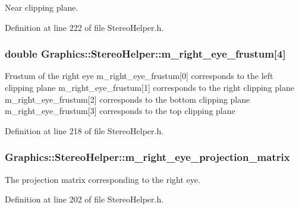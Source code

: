 Near clipping plane. 



Definition at line 222 of file StereoHelper.h.

\hypertarget{class_graphics_1_1_stereo_helper_a2542b4e8d37d72b4bb0ed2e7c3bc919f}{
\subsubsection[{m\_\-right\_\-eye\_\-frustum}]{\setlength{\rightskip}{0pt plus 5cm}double {\bf Graphics::StereoHelper::m\_\-right\_\-eye\_\-frustum}\mbox{[}4\mbox{]}}}
\label{class_graphics_1_1_stereo_helper_a2542b4e8d37d72b4bb0ed2e7c3bc919f}
Frustum of the right eye m\_\-right\_\-eye\_\-frustum\mbox{[}0\mbox{]} corresponds to the left clipping plane m\_\-right\_\-eye\_\-frustum\mbox{[}1\mbox{]} corresponds to the right clipping plane m\_\-right\_\-eye\_\-frustum\mbox{[}2\mbox{]} corresponds to the bottom clipping plane m\_\-right\_\-eye\_\-frustum\mbox{[}3\mbox{]} corresponds to the top clipping plane 

Definition at line 218 of file StereoHelper.h.

\hypertarget{class_graphics_1_1_stereo_helper_aaf3d810febcca0e5c47bcc1924e8b576}{
\subsubsection[{m\_\-right\_\-eye\_\-projection\_\-matrix}]{ {\bf Graphics::StereoHelper::m\_\-right\_\-eye\_\-projection\_\-matrix}}}
\label{class_graphics_1_1_stereo_helper_aaf3d810febcca0e5c47bcc1924e8b576}


The projection matrix corresponding to the right eye. 



Definition at line 202 of file StereoHelper.h.

